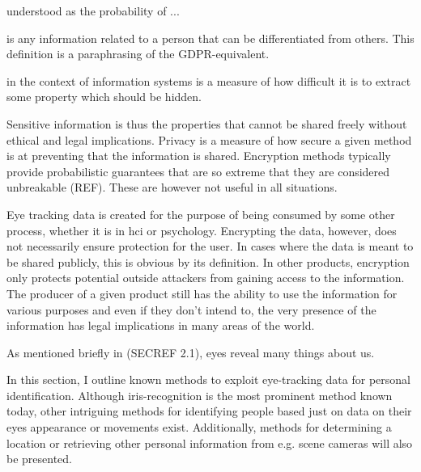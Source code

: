  understood as the probability of ...
 
 



\begin{definition} 
	is any information related to a person that can be differentiated from others. This definition is a paraphrasing of the GDPR-equivalent.
\end{definition}

\begin{definition}[Privacy]
	in the context of information systems is a measure of how difficult it is to extract some property which should be hidden. 
\end{definition}


Sensitive information is thus the properties that cannot be shared freely without ethical and legal implications. Privacy is a measure of how secure a given method is at preventing that the information is shared. Encryption methods typically provide probabilistic guarantees that are so extreme that they are considered unbreakable (REF). These are however not useful in all situations.

Eye tracking data is created for the purpose of being consumed by some other process, whether it is in \acrshort{hci} or psychology. Encrypting the data, however, does not necessarily ensure protection for the user. In cases where the data is meant to be shared publicly, this is obvious by its definition. In other products, encryption only protects potential outside attackers from gaining access to the information. The producer of a given product still has the ability to use the information for various purposes and even if they don't intend to, the very presence of the information has legal implications in many areas of the world.


As mentioned briefly in (SECREF 2.1), eyes reveal many things about us. 

In this section, I outline known methods to exploit eye-tracking data for personal identification. Although iris-recognition is the most prominent method known today, other intriguing methods for identifying people based just on data on their eyes appearance or movements exist. Additionally, methods for determining a location or retrieving other personal information from e.g. scene cameras will also be presented.

